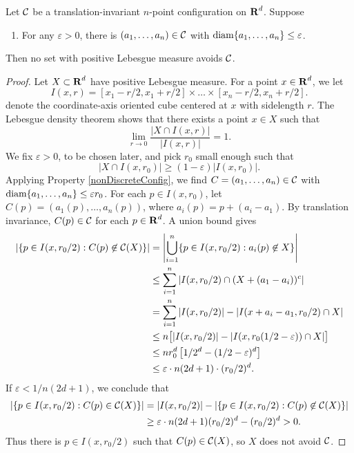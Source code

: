 \begin{theorem}
	Let $\operatorname{\mathcal{C}}$ be a translation-invariant $n$-point configuration on $\operatorname{\mathbf{R}}^d$. Suppose
	\begin{enumerate}
		\item \label{nonDiscreteConfig} For any $\varepsilon > 0$, there is $(a_1, \dots, a_n) \in \operatorname{\mathcal{C}}$ with $\operatorname{\text{diam}} \{ a_1, \dots, a_n \} \leq \varepsilon$.
	\end{enumerate}
	Then no set with positive Lebesgue measure avoids $\operatorname{\mathcal{C}}$.
\end{theorem}
\begin{proof}
	Let $X \subset \operatorname{\mathbf{R}}^d$ have positive Lebesgue measure. For a point $x \in \operatorname{\mathbf{R}}^d$, we let
	\[ I(x,r) = [x_1 - r/2, x_1 + r/2] \times \dots \times [x_n - r/2, x_n + r/2]. \]
	denote the coordinate-axis oriented cube centered at $x$ with sidelength $r$. The Lebesgue density theorem shows that there exists a point $x \in X$ such that
	\[ \lim_{r \to 0} \frac{|X \cap I(x,r)|}{|I(x,r)|} = 1. \]
	We fix $\varepsilon > 0$, to be chosen later, and pick $r_0$ small enough such that
	\[ |X \cap I(x,r_0)| \geq (1 - \varepsilon)|I(x,r_0)|. \]
	Applying Property \ref{nonDiscreteConfig}, we find $C = (a_1, \dots, a_n) \in \operatorname{\mathcal{C}}$ with $\operatorname{\text{diam}} \{ a_1, \dots, a_n \} \leq \varepsilon r_0$. For each $p \in I(x,r_0)$, let $C(p) = (a_1(p), \dots, a_n(p))$, where $a_i(p) = p + (a_i - a_1)$. By translation invariance, $C(p) \in \operatorname{\mathcal{C}}$ for each $p \in \operatorname{\mathbf{R}}^d$. A union bound gives
	\begin{align*}
		\left| \{ p \in I(x,r_0/2) : C(p) \not \in \operatorname{\mathcal{C}}(X) \} \right| &= \left| \bigcup_{i = 1}^n \{ p \in I(x,r_0/2) : a_i(p) \not \in X \} \right|\\
		&\leq \sum_{i = 1}^n |I(x,r_0/2) \cap (X + (a_1 - a_i))^c|\\
		&= \sum_{i = 1}^n |I(x,r_0/2)| - |I(x+a_i-a_1,r_0/2) \cap X|\\
		&\leq n \big[ |I(x,r_0/2)| - |I(x,r_0(1/2 - \varepsilon)) \cap X| \big]\\
		&\leq n r_0^d \left[ 1/2^d - (1/2 - \varepsilon)^d \right] \\
		&\leq \varepsilon \cdot n (2d + 1) \cdot (r_0/2)^d.
	\end{align*}
	If $\varepsilon < 1/n(2d + 1)$, we conclude that
	\begin{align*}
		\left|\left\{ p \in I(x,r_0/2): C(p) \in \operatorname{\mathcal{C}}(X) \right\}\right| &= |I(x,r_0/2)| - \left| \left\{ p \in I(x,r_0/2): C(p) \not \in \operatorname{\mathcal{C}}(X) \right\} \right|\\
		&\geq \varepsilon \cdot n(2d + 1) (r_0/2)^d - (r_0/2)^d > 0.
	\end{align*}
	Thus there is $p \in I(x,r_0/2)$ such that $C(p) \in \operatorname{\mathcal{C}}(X)$, so $X$ does not avoid $\operatorname{\mathcal{C}}$.
\end{proof}

